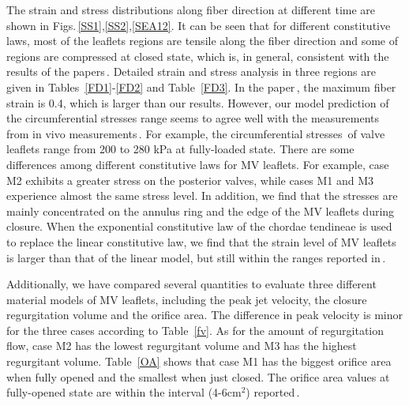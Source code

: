 \documentclass[fleqn,10pt]{wlscirep}
\begin{document}
 The strain and stress distributions along fiber direction at different time are shown in Figs.\,\ref{SS1},\ref{SS2},\ref{SEA12}. It can be seen that for different constitutive laws, most of the leaflets regions are tensile along the fiber direction and some of regions are compressed at closed state, which is, in general, consistent with the results of the papers\,\cite{Prot2009Nonlinear,Prot2010On}. Detailed strain and stress analysis in three regions are given in Tables~\ref{FD1}-\ref{FD2} and Table~\ref{FD3}. In the paper\,\cite{Watton2007Dynamic}, the maximum fiber strain is 0.4, which is larger than our results. However, our model prediction of the circumferential stresses range seems to agree well with the measurements from in vivo measurements\,\cite{Sacks2003Incorporation,Einstein2005The}. For example, the circumferential stresses\,\cite{Sacks2003Incorporation,Einstein2005The} of valve leaflets range from 200 to 280 kPa at fully-loaded state. There are some differences among different constitutive laws for MV leaflets. For example, case M2 exhibits a greater stress on the posterior valves, while cases M1 and M3 experience almost the same stress level. In addition, we find that the stresses are mainly concentrated on the annulus ring and the edge of the MV leaflets during closure. When the exponential constitutive law of the chordae tendineae is used to replace the linear constitutive law, we find that the strain level of  MV leaflets is larger than that of the linear model, but still within the ranges reported in\,\cite{Jimenez2007A}.

Additionally, we have compared several quantities to evaluate three different material models of MV leaflets, including the peak jet velocity, the closure regurgitation volume and the orifice area. The difference in peak velocity is minor for the three cases  according to Table~\ref{fv}. As for the amount of regurgitation flow, case M2 has the lowest regurgitant volume and M3 has the highest regurgitant volume. Table~\ref{OA} shows that case M1 has the biggest orifice area when fully opened and the smallest when just closed. The orifice area values at fully-opened state are within the interval (4-6cm$^2$) reported\,\cite{LuoGriffith-2012}.
\end{document}
